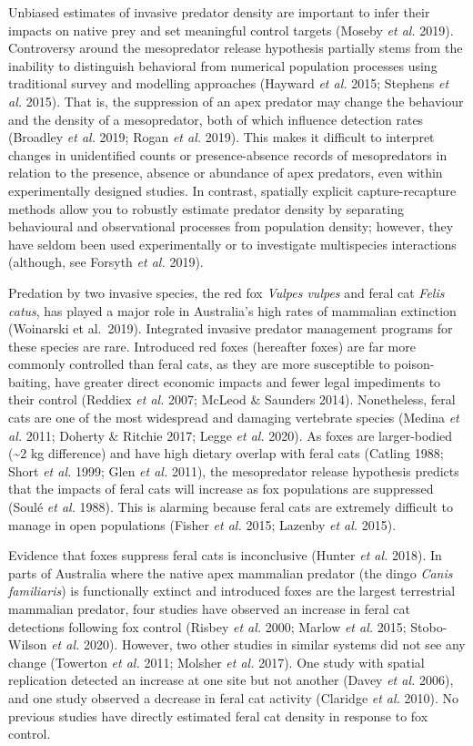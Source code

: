 \documentclass[]{elsarticle} %
\begin{document}
Unbiased estimates of invasive predator density are important to infer their impacts on native prey and set meaningful control targets (Moseby \emph{et al.} 2019). Controversy around the mesopredator release hypothesis partially stems from the inability to distinguish behavioral from numerical population processes using traditional survey and modelling approaches (Hayward \emph{et al.} 2015; Stephens \emph{et al.} 2015). That is, the suppression of an apex predator may change the behaviour and the density of a mesopredator, both of which influence detection rates (Broadley \emph{et al.} 2019; Rogan \emph{et al.} 2019). This makes it difficult to interpret changes in unidentified counts or presence-absence records of mesopredators in relation to the presence, absence or abundance of apex predators, even within experimentally designed studies. In contrast, spatially explicit capture-recapture methods allow you to robustly estimate predator density by separating behavioural and observational processes from population density; however, they have seldom been used experimentally or to investigate multispecies interactions (although, see Forsyth \emph{et al.} 2019).

Predation by two invasive species, the red fox \emph{Vulpes vulpes} and feral cat \emph{Felis catus}, has played a major role in Australia's high rates of mammalian extinction (Woinarski et al.~2019). Integrated invasive predator management programs for these species are rare. Introduced red foxes (hereafter foxes) are far more commonly controlled than feral cats, as they are more susceptible to poison-baiting, have greater direct economic impacts and fewer legal impediments to their control (Reddiex \emph{et al.} 2007; McLeod \& Saunders 2014). Nonetheless, feral cats are one of the most widespread and damaging vertebrate species (Medina \emph{et al.} 2011; Doherty \& Ritchie 2017; Legge \emph{et al.} 2020). As foxes are larger-bodied (\textasciitilde2 kg difference) and have high dietary overlap with feral cats (Catling 1988; Short \emph{et al.} 1999; Glen \emph{et al.} 2011), the mesopredator release hypothesis predicts that the impacts of feral cats will increase as fox populations are suppressed (Soulé \emph{et al.} 1988). This is alarming because feral cats are extremely difficult to manage in open populations (Fisher \emph{et al.} 2015; Lazenby \emph{et al.} 2015).

Evidence that foxes suppress feral cats is inconclusive (Hunter \emph{et al.} 2018). In parts of Australia where the native apex mammalian predator (the dingo \emph{Canis familiaris}) is functionally extinct and introduced foxes are the largest terrestrial mammalian predator, four studies have observed an increase in feral cat detections following fox control (Risbey \emph{et al.} 2000; Marlow \emph{et al.} 2015; Stobo-Wilson \emph{et al.} 2020). However, two other studies in similar systems did not see any change (Towerton \emph{et al.} 2011; Molsher \emph{et al.} 2017). One study with spatial replication detected an increase at one site but not another (Davey \emph{et al.} 2006), and one study observed a decrease in feral cat activity (Claridge \emph{et al.} 2010). No previous studies have directly estimated feral cat density in response to fox control.
\end{document}
